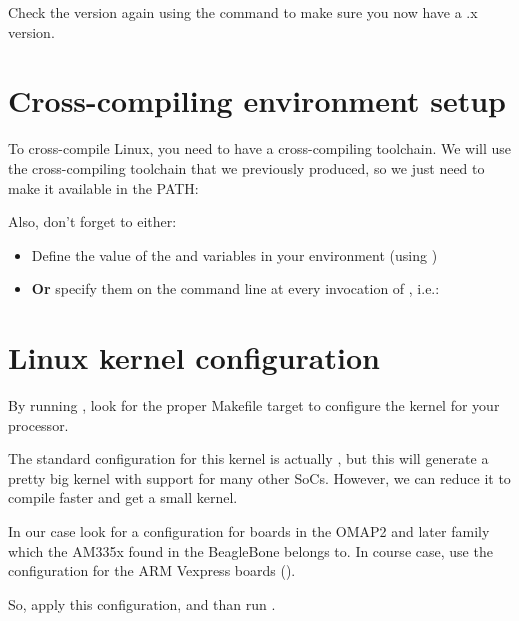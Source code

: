 Check the version again using the  command
to make sure you now have a \workingkernel.x version.

\section{Cross-compiling environment setup}

To cross-compile Linux, you need to have a cross-compiling
toolchain. We will use the cross-compiling toolchain that we
previously produced, so we just need to make it available in the PATH:


Also, don't forget to either:

\begin{itemize}
\item Define the value of the  and 
  variables in your environment (using )
\item {\bf Or} specify them on the command line at every invocation of
  , i.e.: 
\end{itemize}

\section{Linux kernel configuration}

By running , look for the proper Makefile target to
configure the kernel for your processor.

{The standard configuration for this kernel is actually ,
but this will generate a pretty big kernel with support for many other
SoCs. However, we can reduce it to compile faster and get a small
kernel.}{}

{In our case look for a configuration for boards in the OMAP2 and
later family which the AM335x found in the BeagleBone belongs to.}{}
{In course case, use the configuration for the ARM Vexpress boards
().}{}


So, apply this configuration, and than run .

